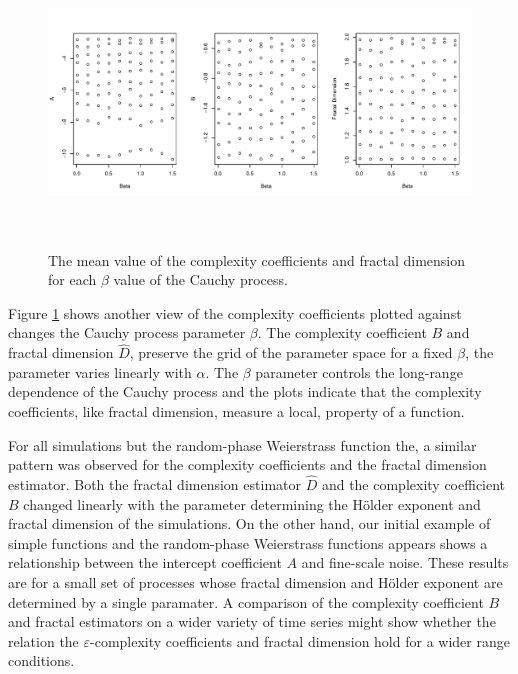 \begin{figure}[h]
  \begin{center}
  \includegraphics[height = 3in, width =6in, keepaspectratio]{./figs/cauchybeta-scatterplots.pdf}
  \end{center}
  \caption{The mean value of the complexity coefficients and fractal dimension for each $\beta$ value of the Cauchy process.}
 \label{fig:cauchy-beta}
\end{figure}

Figure \ref{fig:cauchy-beta} shows another view of 
the complexity coefficients plotted against 
changes the Cauchy process parameter $\beta$. The complexity 
coefficient $B$ and fractal dimension $\hat D$, 
 preserve the grid of the parameter space \textemdash for a fixed 
$\beta$, the parameter varies linearly with $\alpha$. The  
$\beta$ parameter controls the long-range dependence of 
the Cauchy process and the plots indicate that 
the complexity coefficients, like fractal dimension,
measure a local, property of a function.


For all simulations but the random-phase Weierstrass function 
the, a similar pattern was observed for the complexity 
coefficients and the fractal dimension estimator. Both 
the fractal dimension estimator $\hat D$ and the complexity 
coefficient $B$ changed linearly with the parameter
determining the H\"older exponent and fractal dimension of 
the simulations. 
 On the other hand, our initial example of simple functions and the random-phase Weierstrass functions appears shows a relationship between the intercept 
coefficient $A$ and fine-scale noise. These results are for a small set of processes whose fractal dimension and H\"older exponent are
determined by a single paramater. A comparison of the complexity coefficient $B$ and fractal estimators on a wider variety of time series might show whether the relation the $\varepsilon$-complexity coefficients and fractal dimension hold for a wider range 
conditions. 

